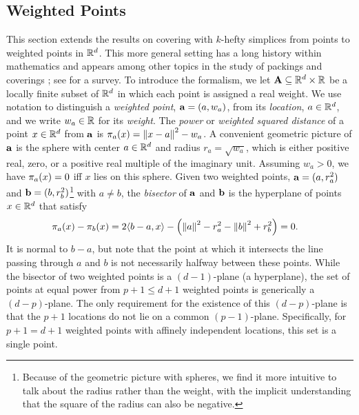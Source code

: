 \documentclass[10pt,a4paper]{article}
\newcommand {\mm}[1] {\ifmmode{#1}\else{\mbox{\(#1\)}}\fi}
\newcommand {\scalprod}[2] {{\langle #1 , #2 \rangle}}
\theoremstyle{plain}
\newcommand{\Rspace}        {\mm{{\mathbb R}}}
\newcommand{\AAA}           {\mm{\bf A}}
\newcommand{\aaa}           {\mm{\bf a}}
\newcommand{\bbb}           {\mm{\bf b}}
\newcommand{\wdist}[2]      {\mm{\pi_{#1}{({#2})}}}
\newcommand{\norm}[1]       {\mm{\|{#1}\|}}
\newcommand{\Edist}[2]      {\mm{\|{#1}-{#2}\|}}
\begin{document}
\subsection{Weighted Points}
\label{sec:2.5}
This section extends the results on covering with $k$-hefty simplices from points to weighted points in $\Rspace^d$.
This more general setting has a long history within mathematics and appears among other topics in the study of packings and coverings \cite{Rog64}; see \cite{Aur87} for a survey.
\smallskip
To introduce the formalism, we let $\AAA \subseteq \Rspace^d \times \Rspace$ be a locally finite subset of $\Rspace^d$ in which each point is assigned a real weight.
We use notation to distinguish a \emph{weighted point}, $\aaa = (a, w_a)$, from its \emph{location}, $a \in \Rspace^d$, and we write $w_a \in \Rspace$ for its \emph{weight}.
The \emph{power} or \emph{weighted squared distance} of a point $x \in \Rspace^d$ from $\aaa$ is $\wdist{a}{x} = \Edist{x}{a}^2 - w_a$.
A convenient geometric picture of $\aaa$ is the sphere with center $a \in \Rspace^d$ and radius $r_a = \sqrt{w_a}$, which is either positive real, zero, or a positive real multiple of the imaginary unit.
Assuming $w_a > 0$, we have $\wdist{a}{x} = 0$ iff $x$ lies on this sphere.
Given two weighted points, $\aaa = (a, r_a^2)$ and $\bbb = (b, r_b^2)$\footnote{Because of the geometric picture with spheres, we find it more intuitive to talk about the radius rather than the weight, with the implicit understanding that the square of the radius can also be negative.} with $a\neq b$, the \emph{bisector} of $\aaa$ and $\bbb$ is the hyperplane of points $x \in \Rspace^d$ that satisfy
\begin{align}
    \wdist{a}{x} - \wdist{b}{x}
    &=2 \scalprod{b-a}{x} - \left( \norm{a}^2 - r_a^2 - \norm{b}^2 + r_b^2 \right)
    = 0 .
\end{align}
It is normal to $b-a$, but note that the point at which it intersects the line passing through $a$ and $b$ is not necessarily halfway between these points.
While the bisector of two weighted points is a $(d-1)$-plane (a hyperplane), the set of points at equal power from $p+1 \leq d+1$ weighted points is generically a $(d-p)$-plane.
The only requirement for the existence of this $(d-p)$-plane is that the $p+1$ locations do not lie on a common $(p-1)$-plane.
Specifically, for $p+1 = d+1$ weighted points with affinely independent locations, this set is a single point.
\end{document}
